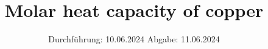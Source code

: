 

\subject{Versuch V47}
\title{Molar heat capacity of copper}
\date{%
  Durchführung: 10.06.2024
  \hspace{3em}
  Abgabe: 11.06.2024
}



\maketitle
\thispagestyle{empty}
\tableofcontents
\newpage






\printbibliography



